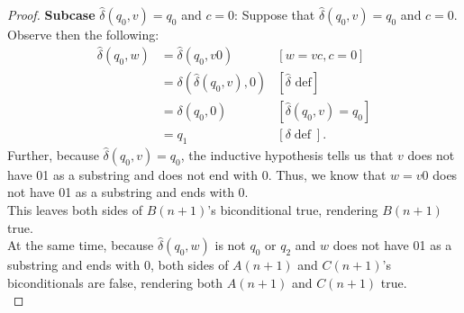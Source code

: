 \documentclass[10pt]{article}
\begin{document}
\begin{enumerate}[label={}]
\begin{proof}
              \textbf{Subcase }$\hat{\delta}\left(q_0, v\right)=q_0$ and $c=0$: Suppose that $\hat{\delta}\left(q_0, v\right)=q_0$ and $c=0$. Observe then the following:
              $$
                  \begin{aligned}
                      \hat{\delta}\left(q_0, w\right) & =\hat{\delta}\left(q_0, v 0\right)                     & {[w=v c, c=0] }                                     \\
                                                      & =\delta\left(\hat{\delta}\left(q_0, v\right), 0\right) & {[\hat{\delta} \text { def}] }                      \\
                                                      & =\delta\left(q_0, 0\right)                             & {\left[\hat{\delta}\left(q_0, v\right)=q_0\right] } \\
                                                      & =q_1                                                   & {[\delta \operatorname{def}] . }
                  \end{aligned}
              $$
              Further, because $\hat{\delta}\left(q_0, v\right)=q_0$, the inductive hypothesis tells us that $v$ does not have 01 as a substring and does not end with 0. Thus, we know that $w=v0$ does not have 01 as a substring and ends with 0.\\
              This leaves both sides of $B(n+1)$'s biconditional true, rendering $B(n+1)$ true.\\
              At the same time, because $\hat{\delta}\left(q_0, w\right)$ is not $q_0$ or $q_2$ and $w$ does not have 01 as a substring and ends with 0, both sides of $A(n+1)$ and $C(n+1)$'s biconditionals are false, rendering both $A(n+1)$ and $C(n+1)$ true.\\


\end{proof}
\end{enumerate}
\end{document}
